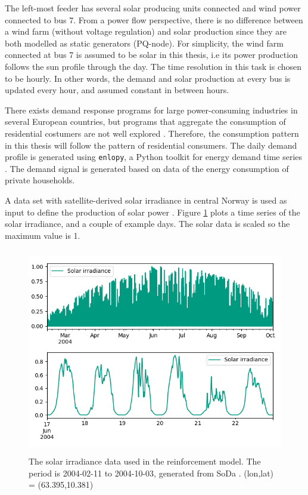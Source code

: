 \documentclass[class=book, crop=false, 11pt]{standalone}
\begin{document}
The left-most feeder has several solar producing units connected and wind power connected to bus 7. From a power flow perspective, there is no difference between a wind farm (without voltage regulation) and solar production since they are both modelled as static generators (PQ-node). For simplicity, the wind farm connected at bus 7 is assumed to be solar in this thesis, i.e its power production follows the sun profile through the day. The time resolution in this task is chosen to be hourly. In other words, the demand and solar production at every bus is updated every hour, and assumed constant in between hours. 

There exists demand response programs for large power-consuming industries in several European countries, but programs that aggregate the consumption of residential costumers are not well explored \cite{koliou2014_aggregator}. Therefore, the consumption pattern in this thesis will follow the pattern of residential consumers. The daily demand profile is generated using \texttt{enlopy}, a Python toolkit for energy demand time series \cite{enlopy}. The demand signal is generated based on data of the energy consumption of private households. 

A data set with satellite-derived solar irradiance in central Norway is used as input to define the production of solar power \cite{solar_data}. Figure \ref{fig:problem:solar_data} plots a time series of the solar irradiance, and a couple of example days. The solar data is scaled so the maximum value is 1.

\begin{figure}[ht]
    \center
    \includegraphics[height=9cm, width=13.5cm]{figures/solar_data.png}
    \caption[size = 9]{The solar irradiance data used in the reinforcement model. The period is 2004-02-11 to 2004-10-03, generated from SoDa \cite{solar_data}. (lon,lat) = (63.395,10.381) }
    \label{fig:problem:solar_data}
\end{figure}
\end{document}
